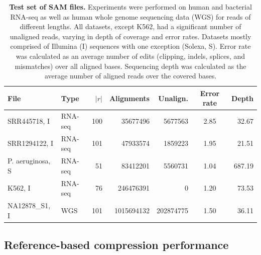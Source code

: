 \documentclass[12pt]{cmuthesis}
\newcommand{\refer}{\textsc{Referee}\xspace}
\begin{document}
  \begin{table}[ht!]
    \caption{\textbf{Test set of SAM files.} Experiments were performed on human and bacterial RNA-seq as well as human whole genome sequencing data (WGS) for reads of different lengths. All datasets, except K562, had a significant number of unaligned reads, varying in depth of coverage and error rates. Datasets mostly comprised of Illumina (I) sequences with one exception (Solexa, S). Error rate was calculated as an average number of edits (clipping, indels, splices, and mismatches) over all aligned bases. Sequencing depth was calculated as the average number of aligned reads over the covered bases.}
    \label{tab:datasets}
    \centering
    \begin{tabular}{l l r r r c r}
    \toprule
    File 			& Type 		& $|r|$ & Alignments & Unalign. & Error rate & Depth \\
    \midrule
    SRR445718, I		& RNA-seq & 100 & 35677496 & 5677563 & 2.85 & 32.67 \\
    SRR1294122, I 		& RNA-seq	& 101 & 47933574 & 1859223 & 1.95 & 21.51 \\
    P. aeruginosa, S 	& RNA-seq	& 51  & 83412201 & 5560731 & 1.04 & 687.19 \\
    K562, I 			& RNA-seq	& 76  & 246476391 & 0 & 1.20 & 73.53 \\
    NA12878\_S1, I 	& WGS 	& 101 & 1015694132 & 202874775 & 1.50 & 36.11 \\
    \bottomrule
    \end{tabular}
  \end{table}



  \subsection{Reference-based compression performance}


\end{document}
